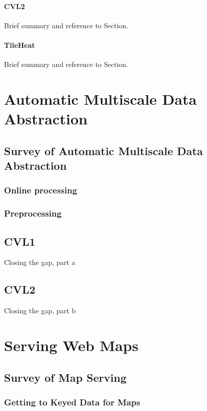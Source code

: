 \documentclass[11pt, oneside]{report}   	%
\begin{document}
\subsection{CVL2}
Brief summary and reference to Section.
\subsection{TileHeat}
Brief summary and reference to Section.


\part{Automatic Multiscale Data Abstraction}

\chapter{Survey of Automatic Multiscale Data Abstraction}

\section{Online processing}

\section{Preprocessing}

\chapter{CVL1}
Closing the gap, part a

\chapter{CVL2} 
Closing the gap, part b

\part{Serving Web Maps}

\chapter{Survey of Map Serving}

\section{Getting to Keyed Data for Maps}
\end{document}
